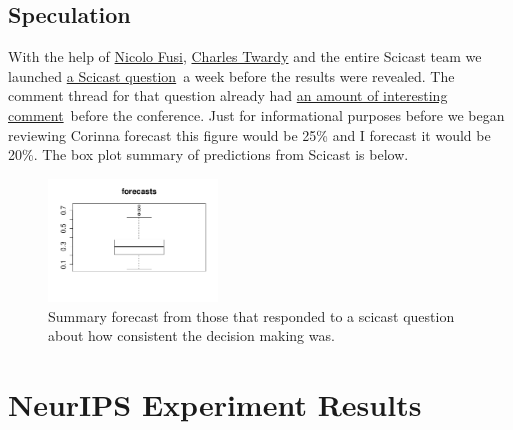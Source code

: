 \hypertarget{speculation}{%
\subsection{Speculation}\label{speculation}}

\begin{flushright}
\end{flushright}

With the help of \href{http://nicolofusi.com/}{Nicolo Fusi},
\href{http://blog.scicast.org/tag/charles-twardy/}{Charles Twardy} and
the entire Scicast team we launched
\href{https://scicast.org/\#!/questions/1083/trades/create/power}{a
Scicast question}~a week before the results were revealed. The comment
thread for that question already had
\href{https://scicast.org/\#!/questions/1083/comments/power}{an amount
of interesting comment}~before the conference. Just for informational
purposes before we began reviewing Corinna forecast this figure would be
25\% and I forecast it would be 20\%. The box plot summary of
predictions from Scicast is below.

\begin{figure}[htb]
\begin{center}
\includegraphics[width=0.40\textwidth]{diagrams/neurips/scicast-forecast.png}
\end{center}


\caption{Summary forecast from those that responded to a scicast question about how consistent the decision making was.}
\label{scicast-forecast}
\end{figure}

\hypertarget{neurips-experiment-results}{%
\section{NeurIPS Experiment
Results}\label{neurips-experiment-results}}

\begin{flushright}
\end{flushright}

